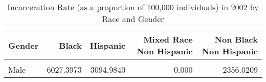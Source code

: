 \begin{table}[H]

\caption{\label{tab:tab:summarystats}Incarceration Rate (as a proportion of 100,000 individuals) in 2002 by Race and Gender}
\centering
\begin{tabular}[t]{lrrrr}
\toprule
Gender & Black & Hispanic & Mixed Race Non Hispanic & Non Black Non Hispanic\\
\midrule
\cellcolor{gray!6}{Female} & \cellcolor{gray!6}{792.2535} & \cellcolor{gray!6}{662.2517} & \cellcolor{gray!6}{2380.952} & \cellcolor{gray!6}{597.9761}\\
Male & 6027.3973 & 3094.9840 & 0.000 & 2356.0209\\
\bottomrule
\end{tabular}
\end{table}
